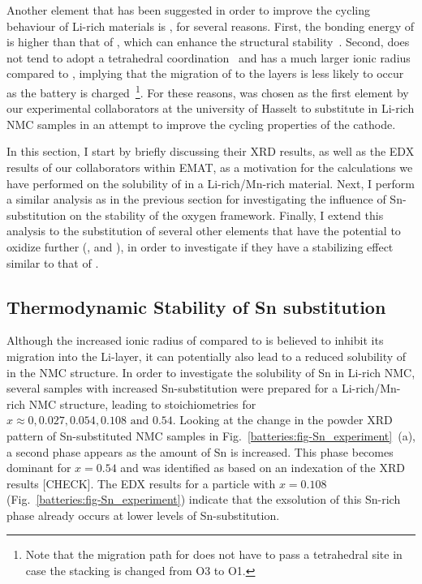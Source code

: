 \begin{refsection}
Another element that has been suggested in order to improve the cycling 
behaviour of Li-rich materials is , for several reasons. First, 
the bonding energy of  is higher than that of , which can 
enhance the structural stability~\cite{Qiao2015}. Second,  does 
not tend to adopt a tetrahedral coordination~\cite{Sathiya2013} and has a much 
larger ionic radius compared to , implying that the migration of 
 to the  layers is less likely to occur as the battery is 
charged~\footnote{Note that the migration path for  does not have 
to pass a tetrahedral site in case the stacking is changed from O3 to O1.}. 
For these reasons,  was chosen as the first element by our 
experimental collaborators at the university of Hasselt to substitute in 
Li-rich NMC samples in an attempt to improve the cycling properties of the 
cathode. 
 
In this section, I start by briefly discussing their XRD results, as well as 
the EDX results of our collaborators within EMAT, as a motivation for the 
calculations we have performed on the solubility of  in a 
Li-rich/Mn-rich material. Next, I perform a similar analysis as in the 
previous section for investigating the influence of Sn-substitution on the 
stability of the oxygen framework. Finally, I extend this analysis to the 
substitution of several other elements that have the potential to oxidize 
further (,  and ), in order to investigate if they have a 
stabilizing effect similar to that of .  
 
 
\subsection{Thermodynamic Stability of Sn substitution} 
\label{batteries:sec-Sn_stability} 
 
Although the increased ionic radius of  compared to  
is believed to inhibit its migration into the Li-layer, it can potentially 
also lead to a reduced solubility of  in the NMC structure. In order to 
investigate the solubility of Sn in Li-rich NMC, several samples with 
increased Sn-substitution were prepared for a Li-rich/Mn-rich NMC structure, 
leading to stoichiometries  
for $x  \approx 0, 0.027, 0.054, 0.108 \textrm{ and } 0.54$. Looking at the 
change in the powder XRD pattern of Sn-substituted NMC samples in 
Fig.~\ref{batteries:fig-Sn_experiment}~(a), a second phase appears as the 
amount of Sn is increased. This phase becomes dominant for $x=0.54$ and was 
identified as  based on an indexation of the XRD results [CHECK]. 
The EDX results for a particle with $x=0.108$ 
(Fig.~\ref{batteries:fig-Sn_experiment}) indicate that the exsolution of this 
Sn-rich phase already occurs at lower levels of Sn-substitution. 
 

\end{refsection}

